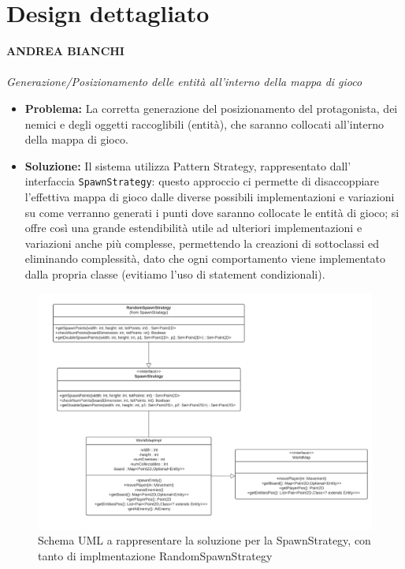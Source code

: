 \documentclass[a4paper,12pt]{report}
\begin{document}
\section{Design dettagliato}
\textbf{ANDREA BIANCHI}
\\ \\
\textit{Generazione/Posizionamento delle entità all’interno della mappa di gioco}
\begin{itemize}
    \item \textbf{Problema:} La corretta generazione del posizionamento del protagonista, dei nemici e degli oggetti raccoglibili (entità), che saranno collocati all’interno della mappa di gioco.
    \item \textbf{Soluzione:} Il sistema utilizza Pattern Strategy, rappresentato dall’ interfaccia \verb|SpawnStrategy|: questo approccio ci permette di disaccoppiare l’effettiva mappa di gioco dalle diverse possibili implementazioni e variazioni su come verranno generati i punti dove saranno collocate le entità di gioco; si offre così una grande estendibilità utile ad ulteriori implementazioni e variazioni anche più complesse, permettendo la creazioni di sottoclassi ed eliminando complessità, dato che ogni comportamento viene implementato dalla propria classe (evitiamo l’uso di statement condizionali).
\end{itemize}
\begin{figure}[H]
\centering{}
\includegraphics[width=\textwidth,height=\textheight,keepaspectratio]{img/spawnStrategy.pdf}
\caption{Schema UML a rappresentare la soluzione per la SpawnStrategy, con tanto di implmentazione RandomSpawnStrategy}
\label{img:spawnStrategyUML}
\end{figure}
\end{document}
